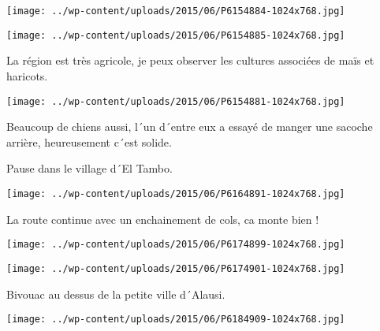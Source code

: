  

\begin{center} \texttt{[image: ../wp-content/uploads/2015/06/P6154884-1024x768.jpg]} \end{center}

 

 

\begin{center} \texttt{[image: ../wp-content/uploads/2015/06/P6154885-1024x768.jpg]} \end{center}

 

 La région est très agricole, je peux observer les cultures associées de maïs et haricots. 

 

\begin{center} \texttt{[image: ../wp-content/uploads/2015/06/P6154881-1024x768.jpg]} \end{center}

 

 Beaucoup de chiens aussi, l´un d´entre eux a essayé de manger une sacoche arrière, heureusement c´est solide. 

 Pause dans le village d´El Tambo. 

 

\begin{center} \texttt{[image: ../wp-content/uploads/2015/06/P6164891-1024x768.jpg]} \end{center}

 

 La route continue avec un enchainement de cols, ca monte bien ! 

 

\begin{center} \texttt{[image: ../wp-content/uploads/2015/06/P6174899-1024x768.jpg]} \end{center}

 

 

\begin{center} \texttt{[image: ../wp-content/uploads/2015/06/P6174901-1024x768.jpg]} \end{center}

 

 Bivouac au dessus de la petite ville d´Alausi. 

 

\begin{center} \texttt{[image: ../wp-content/uploads/2015/06/P6184909-1024x768.jpg]} \end{center}

